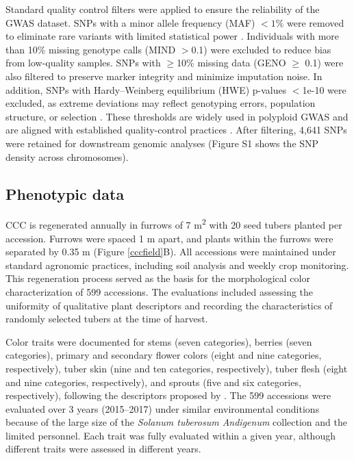 \documentclass[pdflatex,sn-mathphys-ay]{sn-jnl}%
\begin{document}
Standard quality control filters were applied to ensure the reliability of the GWAS dataset. SNPs with a minor allele frequency (MAF) $<1\%$ were removed to eliminate rare variants with limited statistical power \citep{Anderson2010}. Individuals with more than 10\% missing genotype calls (MIND $>$0.1) were excluded to reduce bias from low-quality samples. SNPs with $\geq$10\% missing data (GENO $\geq$ 0.1) were also filtered to preserve marker integrity and minimize imputation noise. In addition, SNPs with Hardy–Weinberg equilibrium (HWE) p-values $<$1e-10 were excluded, as extreme deviations may reflect genotyping errors, population structure, or selection \citep{Wigginton2005}. These thresholds are widely used in polyploid GWAS and are aligned with established quality-control practices \citep{Lu2013, Pavan2020}. After filtering, 4,641 SNPs were retained for downstream genomic analyses (Figure S1 shows the SNP density across chromosomes).


\subsection{Phenotypic data }



CCC is regenerated annually in furrows of 7 m\textsuperscript{2} with 20 seed tubers planted per accession. Furrows were spaced 1 m apart, and plants within the furrows were separated by 0.35 m (Figure \ref{cccfield}B). All accessions were maintained under standard agronomic practices, including soil analysis and weekly crop monitoring. This regeneration process served as the basis for the morphological color characterization of 599 accessions. The evaluations included assessing the uniformity of qualitative plant descriptors and recording the characteristics of randomly selected tubers at the time of harvest.

Color traits were documented for stems (seven categories), berries (seven categories), primary and secondary flower colors (eight and nine categories, respectively), tuber skin (nine and ten categories, respectively), tuber flesh (eight and nine categories, respectively), and sprouts (five and six categories, respectively), following the descriptors proposed by \cite{gomez2000guia}. The 599 accessions were evaluated over 3 years (2015–2017) under similar environmental conditions because of the large size of the \textit{Solanum tuberosum Andigenum} collection and the limited personnel. Each trait was fully evaluated within a given year, although different traits were assessed in different years.
\end{document}
